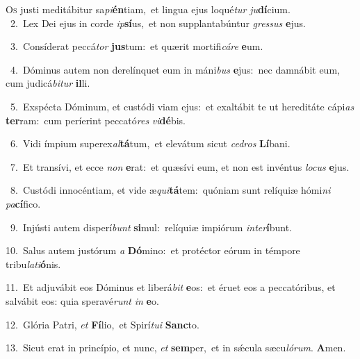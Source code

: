 \lettrine{\initial\textcolor{\initialcolor}{O}}{s} justi meditábitur sa\-\textit{pi}\-\textbf{én}tiam,~\star et lingua ejus loqué\textit{tur} \textit{ju}\-\textbf{dí}cium.\\
{\numbfont\textcolor{\numbcolor}{~2.}}~Lex Dei ejus in corde \textit{ip}\-\textbf{sí}us,~\star et non supplantabúntur \textit{gres}\-\textit{sus} \textbf{e}\-jus.\par
{\numbfont\textcolor{\numbcolor}{~3.}}~Consíderat peccá\textit{tor} \textbf{jus}\-tum:~\star et quærit mortifi\-\textit{cá}\-\textit{re} \textbf{e}\-um.\par
{\numbfont\textcolor{\numbcolor}{~4.}}~Dóminus autem non derelínquet eum in máni\textit{bus} \textbf{e}\-jus:~\star nec damnábit eum, cum judicá\-\textit{bi}\-\textit{tur} \textbf{il}\-li.\par
{\numbfont\textcolor{\numbcolor}{~5.}}~Exspécta Dóminum, et custódi viam ejus:~\dagger et exaltábit te ut hereditáte cápi\textit{as} \textbf{ter}\-ram:~\star cum períerint peccató\textit{res} \textit{vi}\-\textbf{dé}bis.\par
{\numbfont\textcolor{\numbcolor}{~6.}}~Vidi ímpium superex\-\textit{al}\-\textbf{tá}tum,~\star et elevátum sicut \textit{ce}\-\textit{dros} \textbf{Lí}\-bani.\par
{\numbfont\textcolor{\numbcolor}{~7.}}~Et transívi, et ecce \textit{non} \textbf{e}\-rat:~\star et quæsívi eum, et non est invéntus \textit{lo}\-\textit{cus} \textbf{e}\-jus.\par
{\numbfont\textcolor{\numbcolor}{~8.}}~Custódi innocéntiam, et vide æ\-\textit{qui}\-\textbf{tá}tem:~\star quóniam sunt relíquiæ hómi\textit{ni} \textit{pa}\-\textbf{cí}fico.\par
{\numbfont\textcolor{\numbcolor}{~9.}}~Injústi autem disperí\textit{bunt} \textbf{si}\-mul:~\star relíquiæ impiórum \textit{in}\-\textit{ter}\textbf{í}bunt.\par
{\numbfont\textcolor{\numbcolor}{10.}}~Salus autem justórum \textit{a} \textbf{Dó}\-mino:~\star et protéctor eórum in témpore tribu\-\textit{la}\-\textit{ti}\textbf{ó}nis.\par
{\numbfont\textcolor{\numbcolor}{11.}}~Et adjuvábit eos Dóminus et liberá\textit{bit} \textbf{e}\-os:~\star et éruet eos a peccatóribus, et salvábit eos: quia speravé\textit{runt} \textit{in} \textbf{e}\-o.\par
{\numbfont\textcolor{\numbcolor}{12.}}~Glória Patri, \textit{et} \textbf{Fí}\-lio,~\star et Spirí\-\textit{tu}\-\textit{i} \textbf{Sanc}\-to.\par
{\numbfont\textcolor{\numbcolor}{13.}}~Sicut erat in princípio, et nunc, \textit{et} \textbf{sem}\-per,~\star et in sǽcula sæcu\-\textit{ló}\-\textit{rum}. \textbf{A}\-men.\par
